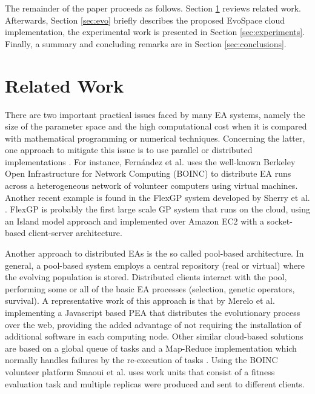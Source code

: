 \documentclass{llncs}
\begin{document}
The remainder of the paper proceeds as follows.  Section \ref{sec:work} 
reviews related work. Afterwards, Section \ref{sec:evo} briefly describes the
proposed EvoSpace cloud implementation, the experimental work is presented in 
Section \ref{sec:experiments}. Finally, a summary and concluding remarks are in
Section \ref{sec:conclusions}.

\section{Related Work}
\label{sec:work}
There are two important practical issues faced by many EA systems, namely the size of the parameter 
space and the high computational cost when it is compared with mathematical programming or numerical techniques.
Concerning the latter, one approach to mitigate this issue is to use parallel or 
distributed implementations \cite{cantu-paz:migration-policies,duda2013gpu}.
For instance, Fern\'andez et al. \cite{nc}%
uses the well-known Berkeley Open Infrastructure for Network Computing (BOINC) to distribute EA runs across a
heterogeneous network of volunteer computers using virtual machines. Another recent example is 
found in the FlexGP system developed by Sherry et al. \cite{sherry2012flex}. FlexGP is probably the first large scale GP system 
that runs on the cloud, using an Island model approach and implemented over Amazon EC2 with a 
socket-based client-server architecture.

Another approach to distributed EAs is the so called pool-based architecture. In general, a 
pool-based system employs a central repository (real or virtual) where the evolving population is stored.
Distributed clients interact with the pool, performing some or all of the basic EA processes 
(selection, genetic operators, survival). A representative work of this approach 
is that by Merelo et al. \cite{agajaj} implementing a Javascript based PEA that distributes 
the evolutionary process over the web, providing the added advantage of not requiring the 
installation of additional software in each computing node.  Other similar cloud-based solutions 
are based on a global queue of tasks and a Map-Reduce implementation which normally handles failures 
by the re-execution of  tasks \cite{fazenda2012,di2013towards,FlexGP}. Using the BOINC 
volunteer platform  Smaoui et al. \cite{FekiNG09} uses work units that consist of a fitness 
evaluation task and multiple replicas  were produced and sent to different clients.
\end{document}
